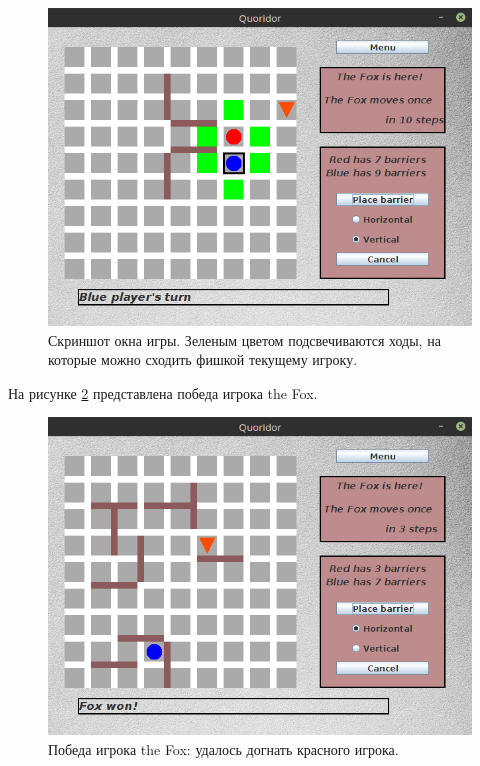 \documentclass[a4paper]{article}
\begin{document}
\begin{figure}[H]
	\begin{center}
		\includegraphics[scale=0.5]{gameGUI1}
		\caption{Скриншот окна игры. Зеленым цветом подсвечиваются ходы, на которые можно сходить фишкой текущему игроку.} 
		\label{pic:gameGUI1} %
	\end{center}
\end{figure}


На рисунке \ref{pic:gameGUI2} представлена победа игрока the Fox.

\begin{figure}[H]
	\begin{center}
		\includegraphics[scale=0.5]{gameGUI2}
		\caption{Победа игрока the Fox: удалось догнать красного игрока.} 
		\label{pic:gameGUI2} %
	\end{center}
\end{figure}
\end{document}
